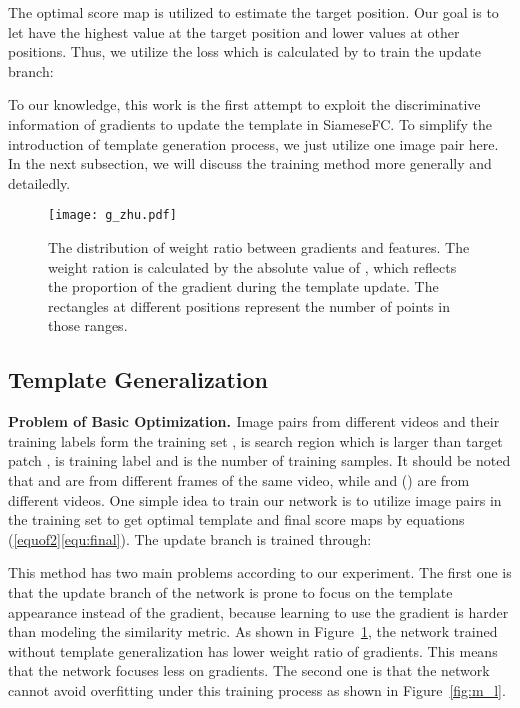 \documentclass[10pt,twocolumn,letterpaper]{article}
\begin{document}
The optimal score map  is utilized to estimate the target position.
Our goal is to let  have the highest value at the target position and lower values at other positions.
Thus, we utilize the loss which is calculated by  to train the update branch:




To our knowledge, this work is the first attempt to exploit the discriminative information of gradients to update the template in SiameseFC.
To simplify the introduction of template generation process, we just utilize one image pair here. In the next subsection, we will discuss the training method more generally and detailedly.

\begin{figure}[t]
	\footnotesize
	\begin{center}
		\texttt{[image: g\_zhu.pdf]}   \\
	\end{center}
	\vspace{-3mm}
	\caption{The distribution of weight ratio between gradients and features. The weight ration is calculated by the absolute value of , which reflects the proportion of the gradient during the template update. The rectangles at different positions represent the number of points in those ranges.}
	\label{fig:g-zhu}
\end{figure}

\subsection{Template Generalization}\label{sec::training}
\noindent
{{\bf{Problem of Basic Optimization. }}}
Image pairs from different videos and their training labels form the training set ,  is search region which is larger than target patch ,  is training label and  is the number of training samples. It should be noted that  and  are from different frames of the same video, while  and  () are from different videos. One simple idea to train our network is to utilize image pairs  in the training set  to get optimal template  and final score maps  by equations (\ref{equof2}\ref{equ:final}).
The update branch is trained through:

This method has two main problems according to our experiment. The first one is that the update branch of the network is prone to focus on the template appearance instead of the gradient, because learning to use the gradient is harder than modeling the similarity metric. As shown in Figure~\ref{fig:g-zhu}, the network trained without template generalization has lower weight ratio of gradients. This means that the network focuses less on gradients. The second one is that the network cannot avoid overfitting under this training process as shown in Figure~\ref{fig:m_l}.
\end{document}
